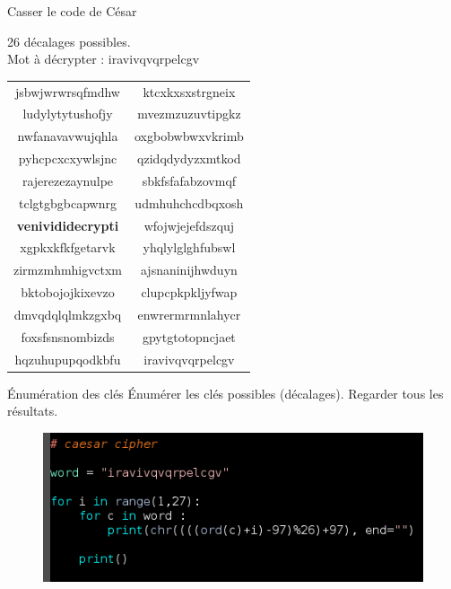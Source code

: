 \documentclass{beamer}
\begin{document}
\begin{frame}{Casser le code de César}
\begin{block}{}
  26 décalages possibles.\\
  Mot à décrypter :  iravivqvqrpelcgv 
\end{block}
  

\footnotesize
\begin{tabular}{c c}
jsbwjwrwrsqfmdhw &  
ktcxkxsxstrgneix\\
ludylytytushofjy &  
mvezmzuzuvtipgkz\\
nwfanavavwujqhla &   
oxgbobwbwxvkrimb\\
pyhcpcxcxywlsjnc & 
qzidqdydyzxmtkod\\
rajerezezaynulpe &
sbkfsfafabzovmqf\\
tclgtgbgbcapwnrg &
udmhuhchcdbqxosh\\
\textbf{\textcolor{red!60!black}{venivididecrypti}} &
wfojwjejefdszquj\\
xgpkxkfkfgetarvk &
yhqlylglghfubswl\\
zirmzmhmhigvctxm &
ajsnaninijhwduyn\\
bktobojojkixevzo &
clupcpkpkljyfwap\\
dmvqdqlqlmkzgxbq &
enwrermrmnlahycr\\
foxsfsnsnombizds &
gpytgtotopncjaet\\
hqzuhupupqodkbfu &
iravivqvqrpelcgv\\
\end{tabular}
\normalsize
  \end{frame}

\begin{frame}{Énumération des clés}
  Énumérer les clés possibles (décalages). Regarder tous les résultats.

  \begin{figure}
    \centering
    \includegraphics[scale = 0.6]{cesarcode.png}
\end{figure}

  \end{frame}
\end{document}
